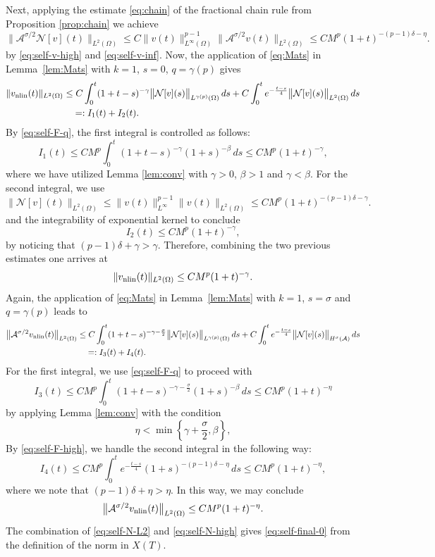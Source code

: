 \documentclass[a4paper,11pt]{article} %
\theoremstyle{remark}
\theoremstyle{definition}
\numberwithin{equation}{section}
\begin{document}
Next, applying the estimate \eqref{eq:chain} of the fractional chain rule from Proposition \ref{prop:chain} we achieve
\begin{equation}\label{eq:self-F-high}
\big\|\mathcal{A}^{\sigma/2}\mathcal{N}[v](t)\big\|_{L^2(\Omega)}
\le
C
\|v(t)\|_{L^\infty(\Omega)}^{p-1}
\big\|\mathcal{A}^{\sigma/2}v(t)\big\|_{L^2(\Omega)}
\le
CM^p
(1+t)^{-(p-1)\delta-\eta}.
\end{equation}
by \eqref{eq:self-v-high} and \eqref{eq:self-v-inf}. Now, the application of \eqref{eq:Mats} in Lemma~\ref{lem:Mats} with $k=1$, $s=0$, $q=\gamma(p)$ gives
\begin{align*}
\|v_{\rm nlin}(t)\|_{L^2(\Omega)}
&\le
C
\int_0^t
(1+t-s)^{-\gamma}
\big\|\mathcal{N}[v](s)\big\|_{L^{\gamma(p)}(\Omega)}\,ds + C\int_0^t e^{-\frac{t-s}{4}} \big\|\mathcal{N}[v](s)\big\|_{L^2(\Omega)}\,ds \nonumber \\
&\quad =: I_1(t) + I_2(t).
\end{align*}
By \eqref{eq:self-F-q}, the first integral is controlled as follows:
\[
I_1(t)
\le
CM^p
\int_0^t
(1+t-s)^{-\gamma}
(1+s)^{-\beta}\,ds
\le
CM^p(1+t)^{-\gamma},
\]
where we have utilized Lemma \ref{lem:conv} with $\gamma>0$, $\beta>1$ and $\gamma<\beta$. For the second integral, we use
\[
\big\|\mathcal{N}[v](t)\big\|_{L^2(\Omega)}
\le
\|v(t)\|_{L^\infty}^{p-1}\|v(t)\|_{L^2(\Omega)}
\le
CM^p
(1+t)^{-(p-1)\delta-\gamma}.
\]
and the integrability of exponential kernel to conclude
\[
I_2(t)
\le
CM^p(1+t)^{-\gamma},
\]
by noticing that $(p-1)\delta+\gamma>\gamma$. Therefore, combining the two previous estimates one arrives at
\begin{equation}\label{eq:self-N-L2}
\|v_{\rm nlin}(t)\|_{L^2(\Omega)}
\le
CM^p(1+t)^{-\gamma}.
\end{equation}
Again, the application of \eqref{eq:Mats} in Lemma~\ref{lem:Mats} with $k=1$, $s=\sigma$ and $q=\gamma(p)$ leads to
\begin{align*}
\big\|\mathcal{A}^{\sigma/2}v_{\rm nlin}(t)\big\|_{L^2(\Omega)}
&\le
C
\int_0^t
(1+t-s)^{-\gamma-\frac{\sigma}{2}}
\big\|\mathcal{N}[v](s)\big\|_{L^{\gamma(p)}(\Omega)}\,ds
+
C
\int_0^t
e^{-\frac{t-s}{4}}
\big\|\mathcal{N}[v](s)\big\|_{H^\sigma(\mathcal{A})}\,ds \notag \\
&\quad =: I_3(t)+ I_4(t).
\end{align*}
For the first integral, we use \eqref{eq:self-F-q} to proceed with
\[
I_3(t)
\le
CM^p
\int_0^t
(1+t-s)^{-\gamma-\frac{\sigma}{2}}
(1+s)^{-\beta}\,ds
\le
CM^p(1+t)^{-\eta}
\]
by applying Lemma \ref{lem:conv} with the condition
\[
\eta<\min\left\{\gamma+\frac{\sigma}{2},\beta\right\},
\]
By \eqref{eq:self-F-high}, we handle the second integral in the following way:
\[
I_4(t)
\le
CM^p
\int_0^t
e^{-\frac{t-s}{4}}
(1+s)^{-(p-1)\delta-\eta}\,ds
\le
CM^p(1+t)^{-\eta},
\]
where we note that $(p-1)\delta+\eta>\eta$. In this way, we may conclude
\begin{equation}\label{eq:self-N-high}
\big\|\mathcal{A}^{\sigma/2}v_{\rm nlin}(t)\big\|_{L^2(\Omega)}
\le
CM^p(1+t)^{-\eta}.
\end{equation}
The combination of \eqref{eq:self-N-L2} and \eqref{eq:self-N-high} gives \eqref{eq:self-final-0} from the definition of the norm in $X(T)$. \medskip
\end{document}
